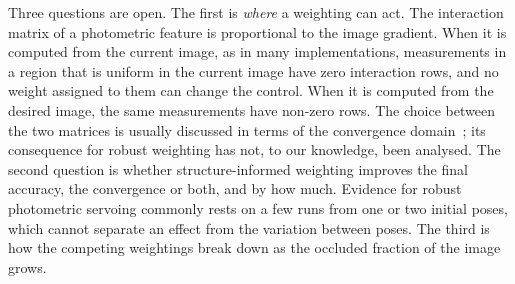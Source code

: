 \documentclass[preprint,12pt]{elsarticle}
\theoremstyle{remark}
\begin{document}
Three questions are open. The first is \emph{where} a weighting can act. The
interaction matrix of a photometric feature is proportional to the image
gradient. When it is computed from the current image, as in many
implementations, measurements in a region that is uniform in the current image
have zero interaction rows, and no weight assigned to them can change the
control. When it is computed from the desired image, the same measurements have
non-zero rows. The choice between the two matrices is usually discussed in
terms of the convergence domain~\cite{chaumette2006vs1,malis2004esm}; its
consequence for robust weighting has not, to our knowledge, been analysed.
The second question is whether structure-informed weighting improves the final
accuracy, the convergence or both, and by how much. Evidence for robust
photometric servoing commonly rests on a few runs from one or two initial
poses, which cannot separate an effect from the variation between poses. The
third is how the competing weightings break down as the occluded fraction of
the image grows.
\end{document}
